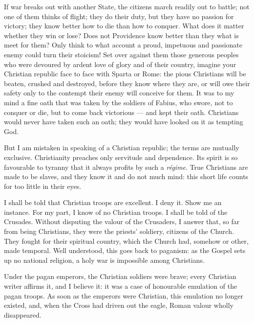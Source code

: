 \documentclass[12pt]{book}
\begin{document}
If war breaks out with another State, the citizens march readily out to battle; not one of them thinks of flight; they do their duty, but they have no passion for victory; they know better how to die than how to conquer. What does it matter whether they win or lose? Does not Providence know better than they what is meet for them? Only think to what account a proud, impetuous and passionate enemy could turn their stoicism! Set over against them those generous peoples who were devoured by ardent love of glory and of their country, imagine your Christian republic face to face with Sparta or Rome: the pious Christians will be beaten, crushed and destroyed, before they know where they are, or will owe their safety only to the contempt their enemy will conceive for them. It was to my mind a fine oath that was taken by the soldiers of Fabius, who swore, not to conquer or die, but to come back victorious — and kept their oath. Christians would never have taken such an oath; they would have looked on it as tempting God.

But I am mistaken in speaking of a Christian republic; the terms are mutually exclusive. Christianity preaches only servitude and dependence. Its spirit is so favourable to tyranny that it always profits by such a \textit{régime}. True Christians are made to be slaves, and they know it and do not much mind: this short life counts for too little in their eyes.

I shall be told that Christian troops are excellent. I deny it. Show me an instance. For my part, I know of no Christian troops. I shall be told of the Crusades. Without disputing the valour of the Crusaders, I answer that, so far from being Christians, they were the priests' soldiery, citizens of the Church. They fought for their spiritual country, which the Church had, somehow or other, made temporal. Well understood, this goes back to paganism: as the Gospel sets up no national religion, a holy war is impossible among Christians.

Under the pagan emperors, the Christian soldiers were brave; every Christian writer affirms it, and I believe it: it was a case of honourable emulation of the pagan troops. As soon as the emperors were Christian, this emulation no longer existed, and, when the Cross had driven out the eagle, Roman valour wholly disappeared.
\end{document}
